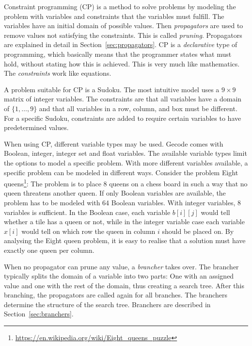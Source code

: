 \documentclass[a4paper,11pt]{article}
\begin{document}
Constraint programming (CP) is a method to solve problems by modeling the problem with variables and constraints that the variables must fulfill. The variables have an initial domain of possible values. Then \textit{propagators} are used to remove values not satisfying the constraints. This is called \textit{pruning}. Propagators are explained in detail in Section~\ref{sec:propagators}. CP is a \textit{declarative} type of programming, which basically means that the programmer states what must hold, without stating how this is achieved. This is very much like mathematics. The \textit{constraints} work like equations.

A problem suitable for CP is a Sudoku. The most intuitive model uses a $9\times9$ matrix of integer variables. The constraints are that all variables have a domain of $\{1,\ldots,9\}$ and that all variables in a row, column, and box must be different. For a specific Sudoku, constraints are added to require certain variables to have predetermined values.

When using CP, different variable types may be used. Gecode comes with Boolean, integer, integer set and float variables. The available variable types limit the options to model a specific problem. With more different variables available, a specific problem can be modeled in different ways. Consider the problem Eight queens\footnote{\url{https://en.wikipedia.org/wiki/Eight_queens_puzzle}}: The problem is to place 8 queens on a chess board in such a way that no queen threatens another queen. If only Boolean variables are available, the problem has to be modeled with 64 Boolean variables. With integer variables, 8 variables is sufficient. In the Boolean case, each variable $b[i][j]$ would tell whether a tile has a queen or not, while in the integer variable case each variable $x[i]$ would tell on which row the queen in column $i$ should be placed on. By analysing the Eight queen problem, it is easy to realise that a solution must have exactly one queen per column.

When no propagator can prune any value, a \textit{brancher} takes over. The brancher typically splits the domain of a variable into two parts: One with an assigned value and one with the rest of the domain, thus creating a search tree. After this branching, the propagators are called again for all branches. The branchers determine the structure of the search tree. Branchers are described in Section~\ref{sec:branchers}. 
\end{document}
